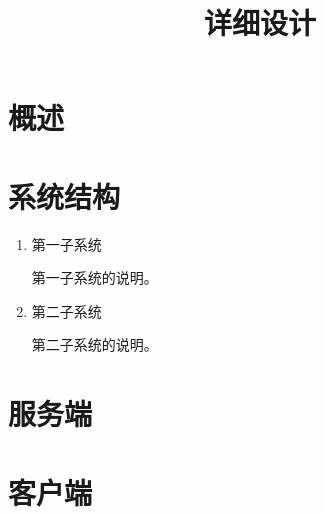 \documentclass[a4paper,12pt]{article}
\title{详细设计}
\begin{document}
\maketitle

\tableofcontents



 \section{概述}
 
 \section{系统结构}
 
 \begin{enumerate}
  \item 第一子系统
  
  第一子系统的说明。
  
  \item 第二子系统
  
  第二子系统的说明。
 \end{enumerate}

 \section{服务端}
 
 \section{客户端}
\end{document}
